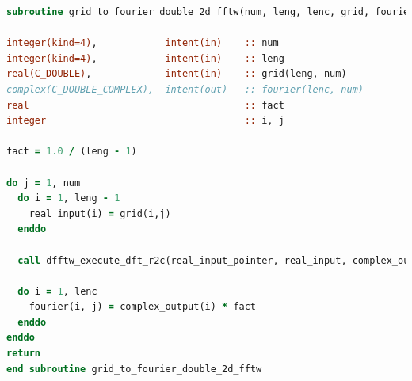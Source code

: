 \documentclass[a4paper,11pt]{report}
\begin{document}
\begin{lstlisting}[language=Fortran,caption={Code used to perform an FFT using the FFTW library. This subroutine can be found in the new \texttt{fftw.F90} module, and transforms a 2D data structure from the spacial domain to frequency domain.}]
subroutine grid_to_fourier_double_2d_fftw(num, leng, lenc, grid, fourier)

integer(kind=4),            intent(in)    :: num    
integer(kind=4),            intent(in)    :: leng   
real(C_DOUBLE),             intent(in)    :: grid(leng, num)
complex(C_DOUBLE_COMPLEX),  intent(out)   :: fourier(lenc, num)
real                                      :: fact 
integer                                   :: i, j

fact = 1.0 / (leng - 1)

do j = 1, num
  do i = 1, leng - 1
    real_input(i) = grid(i,j)
  enddo

  call dfftw_execute_dft_r2c(real_input_pointer, real_input, complex_output)

  do i = 1, lenc
    fourier(i, j) = complex_output(i) * fact
  enddo
enddo
return
end subroutine grid_to_fourier_double_2d_fftw
\end{lstlisting}
\end{document}
